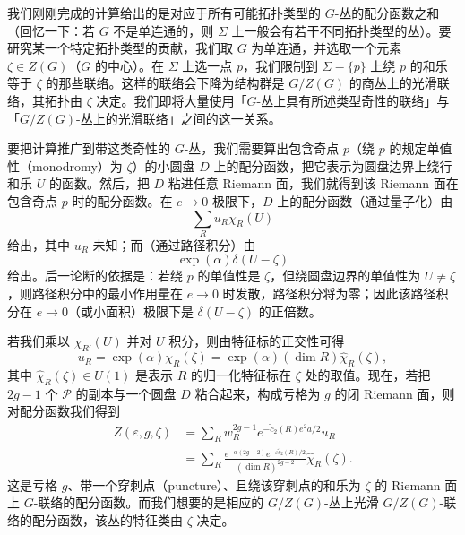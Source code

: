 我们刚刚完成的计算给出的是对应于所有可能拓扑类型的 $G$-丛的配分函数之和（回忆一下：若 $G$ 不是单连通的，则 $\Sigma$ 上一般会有若干不同拓扑类型的丛）。要研究某一个特定拓扑类型的贡献，我们取 $G$ 为单连通，并选取一个元素 $\zeta\in Z(G)$（$G$ 的中心）。在 $\Sigma$ 上选一点 $p$，我们限制到 $\Sigma-\{p\}$ 上绕 $p$ 的和乐等于 $\zeta$ 的那些联络。这样的联络会下降为结构群是 $G/Z(G)$ 的商丛上的光滑联络，其拓扑由 $\zeta$ 决定。我们即将大量使用「$G$-丛上具有所述类型奇性的联络」与「$G/Z(G)$-丛上的光滑联络」之间的这一关系。

要把计算推广到带这类奇性的 $G$-丛，我们需要算出包含奇点 $p$（绕 $p$ 的规定单值性（monodromy）为 $\zeta$）的小圆盘 $D$ 上的配分函数，把它表示为圆盘边界上绕行和乐 $U$ 的函数。然后，把 $D$ 粘进任意 Riemann 面，我们就得到该 Riemann 面在包含奇点 $p$ 时的配分函数。在 $e\to0$ 极限下，$D$ 上的配分函数（通过量子化）由
\begin{equation}
  \tag{11.51}
  \label{eq:11-51}
  \sum_{R}u_R\chi_R(U)
\end{equation}
给出，其中 $u_R$ 未知；而（通过路径积分）由
\begin{equation}
  \tag{11.52}
  \label{eq:11-52}
  \exp(\alpha)\delta(U-\zeta)
\end{equation}
给出。后一论断的依据是：若绕 $p$ 的单值性是 $\zeta$，但绕圆盘边界的单值性为 $U\neq\zeta$，则路径积分中的最小作用量在 $e\to0$ 时发散，路径积分将为零；因此该路径积分在 $e\to0$（或小面积）极限下是 $\delta(U-\zeta)$ 的正倍数。

若我们乘以 $\chi_{R'}(U)$ 并对 $U$ 积分，则由特征标的正交性可得
\begin{equation}
  \tag{11.53}
  \label{eq:11-53}
  u_R=\exp(\alpha)\chi_R(\zeta)=\exp(\alpha)(\dim R)\hat{\chi}_R(\zeta),
\end{equation}
其中 $\hat{\chi}_R(\zeta)\in U(1)$ 是表示 $R$ 的归一化特征标在 $\zeta$ 处的取值。现在，若把 $2g-1$ 个 $\mathcal{P}$ 的副本与一个圆盘 $D$ 粘合起来，构成亏格为 $g$ 的闭 Riemann 面，则对配分函数我们得到
\begin{align}
  \tag{11.54}
  \label{eq:11-54}
  Z(\varepsilon,g,\zeta)&=\sum_{R}w_R^{2g-1}e^{-\tilde{c}_2(R)e^{2}a/2}u_R\\
  \tag{11.55}
  \label{eq:11-55}
  &=\sum_{R}\frac{e^{-\alpha(2g-2)}e^{-\varepsilon\tilde{c}_2(R)/2}}{(\dim R)^{2g-2}}\hat{\chi}_R(\zeta).
\end{align}
这是亏格 $g$、带一个穿刺点（puncture）、且绕该穿刺点的和乐为 $\zeta$ 的 Riemann 面上 $G$-联络的配分函数。而我们想要的是相应的 $G/Z(G)$-丛上光滑 $G/Z(G)$-联络的配分函数，该丛的特征类由 $\zeta$ 决定。

